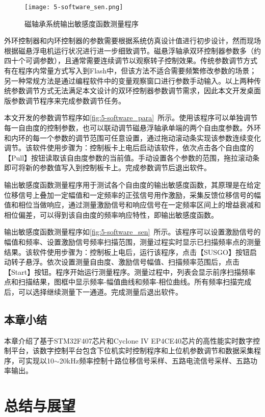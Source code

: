 \documentclass[
  lang=cn,
  degree=master,
  openany,oneside
]{nuaathesis}
\begin{document}
\begin{figure}[h!]
	\texttt{[image: 5-software\_sen.png]}
	\caption{磁轴承系统输出敏感度函数测量程序}
	\label{fig:5-software_sen}
\end{figure}

外环控制器和内环控制器的参数需要根据系统仿真设计值进行初步设计，然而现场根据磁悬浮电机运行状况进行进一步细致调节。磁悬浮轴承双环控制器参数多（约四十个可调参数），且通常需要连续调节以观察转子控制效果。传统参数调节方式有在程序内常量方式写入到Flash中，但该方法不适合需要频繁修改参数的场景；另一种常规方法是通过编程软件中的变量观察窗口进行参数手动输入。以上两种传统参数调节方式无法满足本文设计的双环控制器参数调节需求，因此本文开发桌面版参数调节程序来完成参数调节任务。

本文开发的参数调节程序如\autoref{fig:5-software_para}~所示。使用该程序可以单独调节每一自由度的控制参数，也可以联动调节磁悬浮轴承单端的两个自由度参数。外环和内环的每一个参数的调节范围可任意设置，通过拖动滚动条实现该参数连续变化调节。该软件使用步骤为：控制板卡上电后启动该软件，依次点击各个自由度的【Pull】按钮读取该自由度参数的当前值。手动设置各个参数的范围，拖拉滚动条即可将新的参数值写入到控制板卡上。完成参数调节后退出软件。

输出敏感度函数测量程序用于测试各个自由度的输出敏感度函数，其原理是在给定位移信号上叠加一定幅值和一定频率的正弦信号用作激励，采集反馈位移信号的幅值和相位当做响应，通过测量激励信号和响应信号在一定频率区间上的增益衰减和相位偏差，可以得到该自由度的频率响应特性，即输出敏感度函数。

输出敏感度函数测量程序如\autoref{fig:5-software_sen}~所示。该程序可以设置激励信号的幅值和频率、设置激励信号频率扫描范围，测量过程实时显示已扫描频率点的测量结果。该软件使用步骤为：控制板上电后，运行该程序，点击【SUSGO】按钮启动转子悬浮。依次设置测量自由度、激励信号幅值、扫描频率范围后，点击【Start】按钮。程序开始运行测量程序。测量过程中，列表会显示前序扫描频率点和扫描结果，图框中显示频率-幅值曲线和频率-相位曲线。所有频率扫描完成后，可以选择继续测量下一通道。完成测量后退出软件。


\section{本章小结}
本章介绍了基于STM32F407芯片和Cyclone IV EP4CE40芯片的高性能实时数字控制平台，该数字控制平台包含下位机实时控制程序和上位机参数调节和数据采集程序，可实现以10$\sim$20kHz频率控制十路位移信号采样、五路电流信号采样、五路功率输出。

\chapter{总结与展望}
\end{document}
